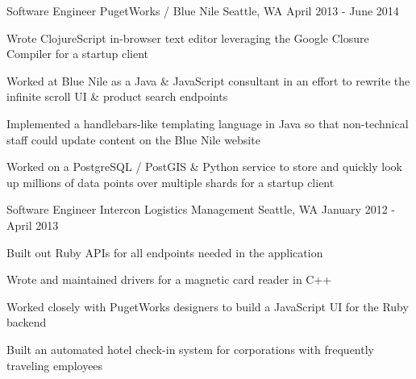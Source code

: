 \begin{cventries}
  \cventry
    {Software Engineer} %
    {PugetWorks / Blue Nile} %
    {Seattle, WA} %
    {April 2013 - June 2014} %
    {
      \begin{cvitems} %
        \item {Wrote ClojureScript in-browser text editor leveraging the Google Closure Compiler for a startup client}
        \item {Worked at Blue Nile as a Java \& JavaScript consultant in an effort to rewrite the infinite scroll UI \& product search endpoints}
        \item {Implemented a handlebars-like templating language in Java so that non-technical staff could update content on the Blue Nile website}
        \item {Worked on a PostgreSQL / PostGIS \& Python service to store and quickly look up millions of data points over multiple shards for a startup client}
      \end{cvitems}
    }

  \cventry
    {Software Engineer} %
    {Intercon Logistics Management} %
    {Seattle, WA} %
    {January 2012 - April 2013} %
    {
      \begin{cvitems} %
        \item {Built out Ruby APIs for all endpoints needed in the application}
        \item {Wrote and maintained drivers for a magnetic card reader in C++}
        \item {Worked closely with PugetWorks designers to build a JavaScript UI for the Ruby backend}
        \item {Built an automated hotel check-in system for corporations with frequently traveling employees}
      \end{cvitems}
    }

\end{cventries}
